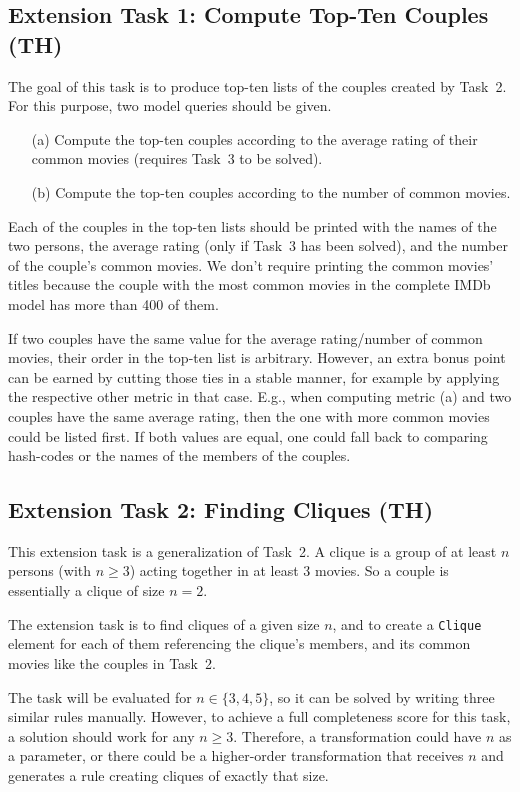 \documentclass[a4paper,11pt]{article}
\begin{document}
\subsection{Extension Task 1: Compute Top-Ten Couples (TH)}

The goal of this task is to produce top-ten lists of the couples created by
Task~2.  For this purpose, two model queries should be given.

\begin{enumerate}
\item[(a)] Compute the top-ten couples according to the average rating of their
  common movies (requires Task~3 to be solved).
\item[(b)] Compute the top-ten couples according to the number of common
  movies.
\end{enumerate}

Each of the couples in the top-ten lists should be printed with the names of
the two persons, the average rating (only if Task~3 has been solved), and the
number of the couple's common movies.  We don't require printing the common
movies' titles because the couple with the most common movies in the complete
IMDb model has more than 400 of them.

If two couples have the same value for the average rating/number of common
movies, their order in the top-ten list is arbitrary.  However, an extra bonus
point can be earned by cutting those ties in a stable manner, for example by
applying the respective other metric in that case.  E.g., when computing metric
(a) and two couples have the same average rating, then the one with more common
movies could be listed first.  If both values are equal, one could fall back to
comparing hash-codes or the names of the members of the couples.

\subsection{Extension Task 2: Finding Cliques (TH)}

This extension task is a generalization of Task~2.  A clique is a group of at
least \(n\) persons (with \(n \geq 3\)) acting together in at least 3 movies.
So a couple is essentially a clique of size \(n = 2\).

The extension task is to find cliques of a given size \(n\), and to create a
\verb|Clique| element for each of them referencing the clique's members, and
its common movies like the couples in Task~2.

The task will be evaluated for \(n \in \{3, 4, 5\}\), so it can be solved by
writing three similar rules manually.  However, to achieve a full completeness
score for this task, a solution should work for any \(n \geq 3\).  Therefore, a
transformation could have \(n\) as a parameter, or there could be a
higher-order transformation that receives \(n\) and generates a rule creating
cliques of exactly that size.
\end{document}
